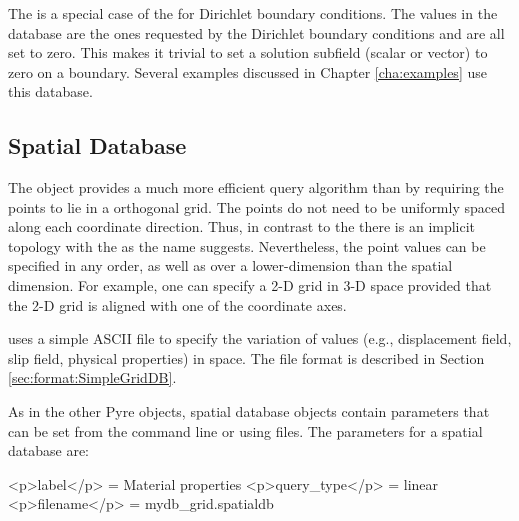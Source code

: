 \subsubsection{}
\label{sec:ZeroDB}

The  is a special case of the  for
Dirichlet boundary conditions. The values in the database are the ones
requested by the Dirichlet boundary conditions and are all set to
zero. This makes it trivial to set a solution subfield (scalar or
vector) to zero on a boundary. Several examples discussed in Chapter
\vref{cha:examples} use this database.


\subsection{ Spatial Database}
\label{sec:SimpleGridDB}

The  object provides a much more efficient query
algorithm than  by requiring the points to lie in a
orthogonal grid. The points do not need to be uniformly spaced along
each coordinate direction. Thus, in contrast to the 
there is an implicit topology with the  as the
name suggests. Nevertheless, the point values can be specified in any
order, as well as over a lower-dimension than the spatial dimension.
For example, one can specify a 2-D grid in 3-D space provided that the
2-D grid is aligned with one of the coordinate axes.

 uses a simple ASCII file to specify the variation of
values (e.g., displacement field, slip field, physical properties) in
space. The file format is described in Section
\vref{sec:format:SimpleGridDB}.

As in the other Pyre objects, spatial database objects contain parameters
that can be set from the command line or using 
files. The parameters for a spatial database are:
\begin{inventory}
\end{inventory}

\begin{cfg}
<p>label</p> = Material properties
<p>query_type</p> = linear
<p>filename</p> = mydb_grid.spatialdb
\end{cfg}

